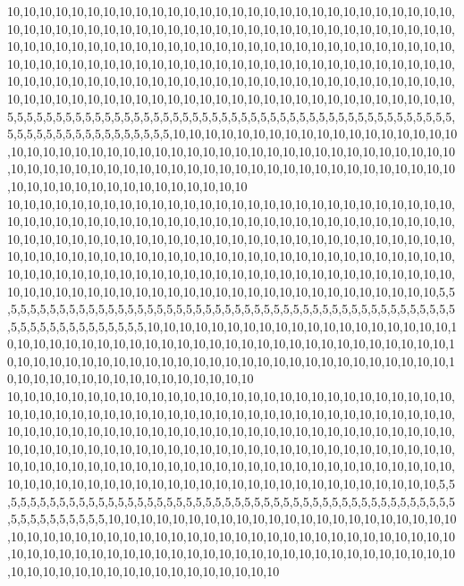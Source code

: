 10,10,10,10,10,10,10,10,10,10,10,10,10,10,10,10,10,10,10,10,10,10,10,10,10,10,10,10,10,10,10,10,10,10,10,10,10,10,10,10,10,10,10,10,10,10,10,10,10,10,10,10,10,10,10,10,10,10,10,10,10,10,10,10,10,10,10,10,10,10,10,10,10,10,10,10,10,10,10,10,10,10,10,10,10,10,10,10,10,10,10,10,10,10,10,10,10,10,10,10,10,10,10,10,10,10,10,10,10,10,10,10,10,10,10,10,10,10,10,10,10,10,10,10,10,10,10,10,10,10,10,10,10,10,10,10,10,10,10,10,10,10,10,10,10,10,10,10,10,10,10,10,10,10,10,10,10,10,10,10,10,10,10,10,10,10,10,10,5,5,5,5,5,5,5,5,5,5,5,5,5,5,5,5,5,5,5,5,5,5,5,5,5,5,5,5,5,5,5,5,5,5,5,5,5,5,5,5,5,5,5,5,5,5,5,5,5,5,5,5,5,5,5,5,5,5,5,5,5,5,5,10,10,10,10,10,10,10,10,10,10,10,10,10,10,10,10,10,10,10,10,10,10,10,10,10,10,10,10,10,10,10,10,10,10,10,10,10,10,10,10,10,10,10,10,10,10,10,10,10,10,10,10,10,10,10,10,10,10,10,10,10,10,10,10,10,10,10,10,10,10,10,10,10,10,10,10,10,10,10,10,10,10,10,10,10,10,10,10,10
10,10,10,10,10,10,10,10,10,10,10,10,10,10,10,10,10,10,10,10,10,10,10,10,10,10,10,10,10,10,10,10,10,10,10,10,10,10,10,10,10,10,10,10,10,10,10,10,10,10,10,10,10,10,10,10,10,10,10,10,10,10,10,10,10,10,10,10,10,10,10,10,10,10,10,10,10,10,10,10,10,10,10,10,10,10,10,10,10,10,10,10,10,10,10,10,10,10,10,10,10,10,10,10,10,10,10,10,10,10,10,10,10,10,10,10,10,10,10,10,10,10,10,10,10,10,10,10,10,10,10,10,10,10,10,10,10,10,10,10,10,10,10,10,10,10,10,10,10,10,10,10,10,10,10,10,10,10,10,10,10,10,10,10,10,10,10,5,5,5,5,5,5,5,5,5,5,5,5,5,5,5,5,5,5,5,5,5,5,5,5,5,5,5,5,5,5,5,5,5,5,5,5,5,5,5,5,5,5,5,5,5,5,5,5,5,5,5,5,5,5,5,5,5,5,5,5,5,5,10,10,10,10,10,10,10,10,10,10,10,10,10,10,10,10,10,10,10,10,10,10,10,10,10,10,10,10,10,10,10,10,10,10,10,10,10,10,10,10,10,10,10,10,10,10,10,10,10,10,10,10,10,10,10,10,10,10,10,10,10,10,10,10,10,10,10,10,10,10,10,10,10,10,10,10,10,10,10,10,10,10,10,10,10,10,10,10,10,10,10
10,10,10,10,10,10,10,10,10,10,10,10,10,10,10,10,10,10,10,10,10,10,10,10,10,10,10,10,10,10,10,10,10,10,10,10,10,10,10,10,10,10,10,10,10,10,10,10,10,10,10,10,10,10,10,10,10,10,10,10,10,10,10,10,10,10,10,10,10,10,10,10,10,10,10,10,10,10,10,10,10,10,10,10,10,10,10,10,10,10,10,10,10,10,10,10,10,10,10,10,10,10,10,10,10,10,10,10,10,10,10,10,10,10,10,10,10,10,10,10,10,10,10,10,10,10,10,10,10,10,10,10,10,10,10,10,10,10,10,10,10,10,10,10,10,10,10,10,10,10,10,10,10,10,10,10,10,10,10,10,10,10,10,10,10,10,10,5,5,5,5,5,5,5,5,5,5,5,5,5,5,5,5,5,5,5,5,5,5,5,5,5,5,5,5,5,5,5,5,5,5,5,5,5,5,5,5,5,5,5,5,5,5,5,5,5,5,5,5,5,5,5,5,5,5,10,10,10,10,10,10,10,10,10,10,10,10,10,10,10,10,10,10,10,10,10,10,10,10,10,10,10,10,10,10,10,10,10,10,10,10,10,10,10,10,10,10,10,10,10,10,10,10,10,10,10,10,10,10,10,10,10,10,10,10,10,10,10,10,10,10,10,10,10,10,10,10,10,10,10,10,10,10,10,10,10,10,10,10,10,10,10,10,10,10,10,10,10,10,10
